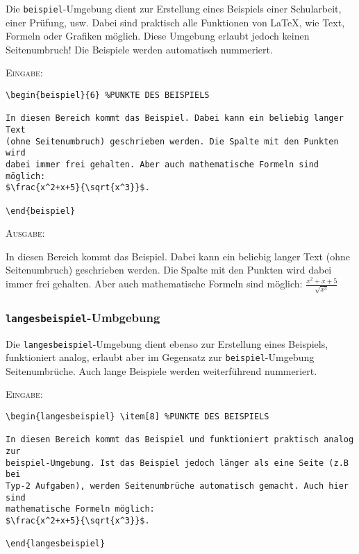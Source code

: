 \documentclass[a4paper,12pt]{article}
\begin{document}
Die \texttt{beispiel}-Umgebung dient zur Erstellung eines Beispiels einer Schularbeit, einer Prüfung, usw. Dabei sind praktisch alle Funktionen von \LaTeX, wie Text, Formeln oder Grafiken möglich. Diese Umgebung erlaubt jedoch keinen Seitenumbruch! Die Beispiele werden automatisch nummeriert.

\leer

\textsc{Eingabe:}
\begin{verbatim}
\begin{beispiel}{6} %PUNKTE DES BEISPIELS

In diesen Bereich kommt das Beispiel. Dabei kann ein beliebig langer Text
(ohne Seitenumbruch) geschrieben werden. Die Spalte mit den Punkten wird 
dabei immer frei gehalten. Aber auch mathematische Formeln sind möglich:
$\frac{x^2+x+5}{\sqrt{x^3}}$.

\end{beispiel}
\end{verbatim}

\leer

\textsc{Ausgabe:}\leer

\begin{beispiel}{6} %
In diesen Bereich kommt das Beispiel. Dabei kann ein beliebig langer Text
(ohne Seitenumbruch) geschrieben werden. Die Spalte mit den Punkten wird dabei 
immer frei gehalten. Aber auch mathematische Formeln sind möglich:
$\frac{x^2+x+5}{\sqrt{x^3}}$


\end{beispiel}


\vspace{1cm}

\subsubsection{\texttt{langesbeispiel}-Umbgebung}

Die \texttt{langesbeispiel}-Umgebung dient ebenso zur Erstellung eines Beispiels, funktioniert analog, erlaubt aber im Gegensatz zur \texttt{beispiel}-Umgebung Seitenumbrüche. Auch lange Beispiele werden weiterführend nummeriert.

\leer

\textsc{Eingabe:}
\begin{verbatim}
\begin{langesbeispiel} \item[8] %PUNKTE DES BEISPIELS

In diesen Bereich kommt das Beispiel und funktioniert praktisch analog zur
beispiel-Umgebung. Ist das Beispiel jedoch länger als eine Seite (z.B bei 
Typ-2 Aufgaben), werden Seitenumbrüche automatisch gemacht. Auch hier sind
mathematische Formeln möglich:
$\frac{x^2+x+5}{\sqrt{x^3}}$.		

\end{langesbeispiel}

\end{verbatim}
\end{document}
